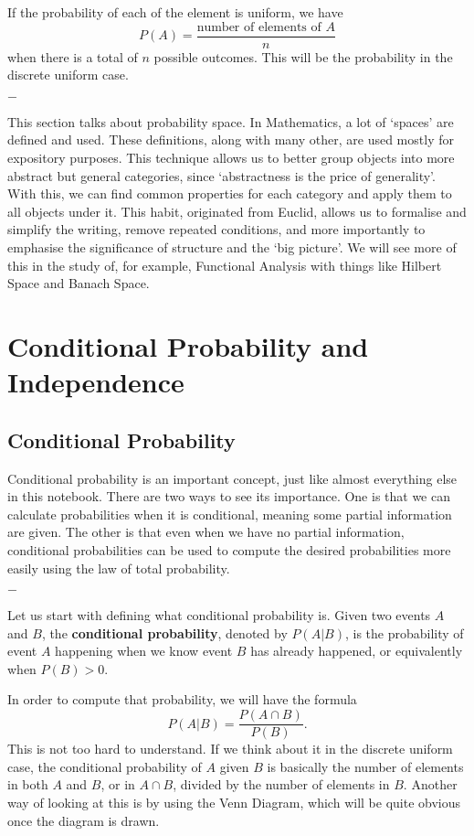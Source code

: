 \documentclass[11pt, a4paper, oneside]{book}
\theoremstyle{definition}
\newcommand{\breaking}{%
    \begin{center}
    $-$
    \end{center}%
}
\begin{document}
\noindent If the probability of each of the element is uniform, we have \[
P(A) = \frac{\text{number of elements of }A}{n}
\]
when there is a total of $n$ possible outcomes. This will be the probability in the discrete uniform case. 

\breaking

\noindent This section talks about probability space. In Mathematics, a lot of `spaces' are defined and used. These definitions, along with many other, are used mostly for expository purposes. This technique allows us to better group objects into more abstract but general categories, since `abstractness is the price of generality'. With this, we can find common properties for each category and apply them to all objects under it. This habit, originated from Euclid, allows us to formalise and simplify the writing, remove repeated conditions, and more importantly to emphasise the significance of structure and the `big picture'. We will see more of this in the study of, for example, Functional Analysis with things like Hilbert Space and Banach Space. 

\section{Conditional Probability and Independence}

\subsection{Conditional Probability}

Conditional probability is an important concept, just like almost everything else in this notebook. There are two ways to see its importance. One is that we can calculate probabilities when it is conditional, meaning some partial information are given. The other is that even when we have no partial information, conditional probabilities can be used to compute the desired probabilities more easily using the law of total probability.

\breaking

\noindent Let us start with defining what conditional probability is. Given two events $A$ and $B$, the \textbf{conditional probability}, denoted by $P(A|B)$, is the probability of event $A$ happening when we know event $B$ has already happened, or equivalently when $P(B) > 0$.

\noindent In order to compute that probability, we will have the formula \[
P(A|B) = \frac{P(A \cap B)}{P(B)}.
\]
This is not too hard to understand. If we think about it in the discrete uniform case, the conditional probability of $A$ given $B$ is basically the number of elements in both $A$ and $B$, or in $A \cap B$, divided by the number of elements in $B$. Another way of looking at this is by using the Venn Diagram, which will be quite obvious once the diagram is drawn. 
\end{document}
